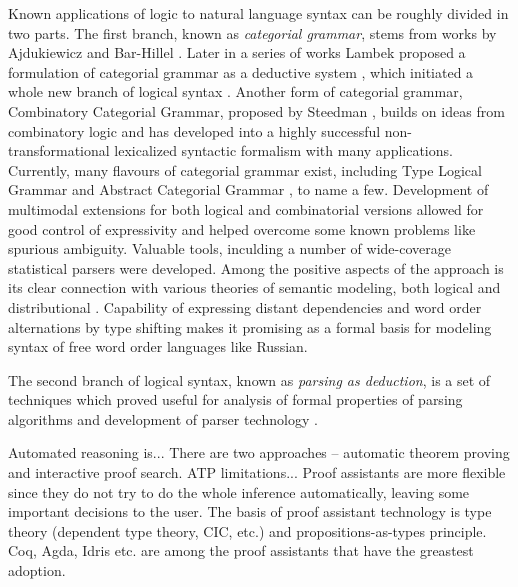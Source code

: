 \documentclass[a4paper]{article}
\theoremstyle{example-style}
\begin{document}
Known applications of logic to natural language syntax can be roughly divided in two parts. The first branch, known as \textit{categorial grammar}, stems from works by Ajdukiewicz and Bar-Hillel \parencite{ajdukiewicz1935,bar1953quasi}. Later in a series of works Lambek proposed a formulation of categorial grammar as a deductive system \parencite{lambek1958mathematics,lambek1961calculus}, which initiated a whole new branch of logical syntax \parencite{moot2012logic}. Another form of categorial grammar, Combinatory Categorial Grammar, proposed by Steedman \parencite{steedman2000syntactic}, builds on ideas from combinatory logic and has developed into a highly successful non-transformational lexicalized syntactic formalism with many applications. Currently, many flavours of categorial grammar exist, including Type Logical Grammar \parencite{morrill1994type} and Abstract Categorial Grammar \parencite{degroot2001towards}, to name a few. Development of multimodal extensions for both logical and combinatorial versions allowed for good control of expressivity and helped overcome some known problems like spurious ambiguity. Valuable tools, inculding a number of wide-coverage statistical parsers \parencite{curran2007linguistically,white2008open} were developed. Among the positive aspects of the approach is its clear connection with various theories of semantic modeling, both logical \parencite{steedman2000syntactic,bos2008wide,baldridge2002coupling} and distributional \parencite{maillard2014type}. Capability of expressing distant dependencies and word order alternations by type shifting makes it promising as a formal basis for modeling syntax of free word order languages like Russian.

The second branch of logical syntax, known as \textit{parsing as deduction}, is a set of techniques which proved useful for analysis of formal properties of parsing algorithms and development of parser technology \parencite{pereira1983parsing,kallmeyer2010parsing}.

Automated reasoning is... There are two approaches -- automatic theorem proving and interactive proof search. ATP limitations... Proof assistants are more flexible since they do not try to do the whole inference automatically, leaving some important decisions to the user. The basis of proof assistant technology is type theory (dependent type theory, CIC, etc.) and propositions-as-types principle. Coq, Agda, Idris etc. are among the proof assistants that have the greastest adoption. 
\end{document}
